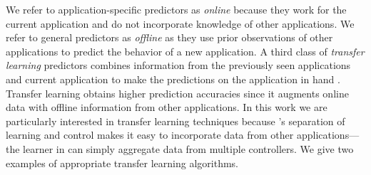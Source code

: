We refer to application-specific predictors as \emph{online} because
they work for the current application and do not incorporate knowledge
of other applications.  We refer to general predictors as
\emph{offline} as they use prior observations of other applications to
predict the behavior of a new application. A third class of
\emph{transfer learning} predictors combines information from the
previously seen applications and current application to make the
predictions on the application in hand \cite{pan2010survey}. Transfer
learning obtains higher prediction accuracies since it augments online
data with offline information from other applications.  In this work
we are particularly interested in transfer learning techniques because
\SYSTEM{}'s separation of learning and control makes it easy to
incorporate data from other applications---the learner in
 can simply aggregate data from multiple
controllers. We give two examples of appropriate transfer learning
algorithms.


